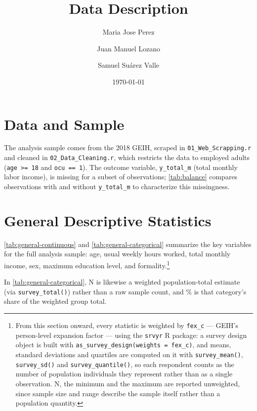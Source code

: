 \documentclass[11pt]{article}
\title{Data Description}
\author{Maria Jose Perez \and Juan Manuel Lozano \and Samuel Suárez Valle}
\date{\today}
\begin{document}
\maketitle
\tableofcontents
\newpage

\section{Data and Sample}

The analysis sample comes from the 2018 GEIH, scraped in \texttt{01\_Web\_Scrapping.r} and
cleaned in \texttt{02\_Data\_Cleaning.r}, which restricts the data to employed adults
(\texttt{age >= 18} and \texttt{ocu == 1}). The outcome variable, \texttt{y\_total\_m}
(total monthly labor income), is missing for a subset of observations; \autoref{tab:balance}
compares observations with and without \texttt{y\_total\_m} to characterize this
missingness.



\section{General Descriptive Statistics}

\autoref{tab:general-continuous} and \autoref{tab:general-categorical} summarize the
key variables for the full analysis sample: age, usual weekly hours worked, total
monthly income, sex, maximum education level, and formality.\footnote{From this
section onward, every statistic is weighted by \texttt{fex\_c} --- GEIH's
person-level expansion factor --- using the \texttt{srvyr} R package: a survey
design object is built with \texttt{as\_survey\_design(weights = fex\_c)}, and
means, standard deviations and quartiles are computed on it with
\texttt{survey\_mean()}, \texttt{survey\_sd()} and \texttt{survey\_quantile()}, so
each respondent counts as the number of population individuals they represent
rather than as a single observation. N, the minimum and the maximum are reported
unweighted, since sample size and range describe the sample itself rather than a
population quantity.}

In \autoref{tab:general-categorical}, N is likewise a weighted population-total
estimate (via \texttt{survey\_total()}) rather than a raw sample count, and \%
is that category's share of the weighted group total.




\end{document}
